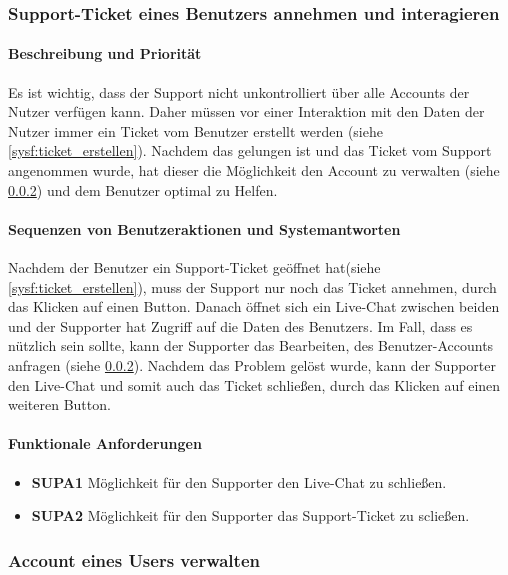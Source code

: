 \subsubsection{Support-Ticket eines Benutzers annehmen und \label{sysf:ticket_annehmen}
interagieren}
\paragraph{Beschreibung und Priorität}
Es ist wichtig, dass der Support nicht unkontrolliert über alle Accounts der Nutzer verfügen kann. Daher müssen vor einer Interaktion mit den Daten der Nutzer immer ein Ticket vom Benutzer erstellt werden (siehe \ref{sysf:ticket_erstellen}).
Nachdem das gelungen ist und das Ticket vom Support angenommen wurde, hat dieser die Möglichkeit den Account zu verwalten (siehe \ref{sysf:support_account_verwalten}) und dem Benutzer optimal zu Helfen.
\paragraph{Sequenzen von Benutzeraktionen und Systemantworten}
Nachdem der Benutzer ein Support-Ticket geöffnet hat(siehe \ref{sysf:ticket_erstellen}), muss der Support nur noch das Ticket annehmen, durch das Klicken auf einen Button. Danach öffnet sich ein Live-Chat zwischen beiden und der Supporter hat Zugriff auf die Daten des Benutzers. Im Fall, dass es nützlich sein sollte, kann der Supporter das Bearbeiten, des Benutzer-Accounts anfragen (siehe \ref{sysf:support_account_verwalten}). Nachdem das Problem gelöst wurde, kann der Supporter den Live-Chat und somit auch das Ticket schließen, durch das Klicken auf einen weiteren Button.
\paragraph{Funktionale Anforderungen}
\begin{itemize}
	\item \textbf{SUPA1} Möglichkeit für den Supporter den Live-Chat zu schließen. 
	\item \textbf{SUPA2} Möglichkeit für den Supporter das Support-Ticket zu scließen.
\end{itemize}

\subsubsection{Account eines Users verwalten}
\label{sysf:support_account_verwalten}
